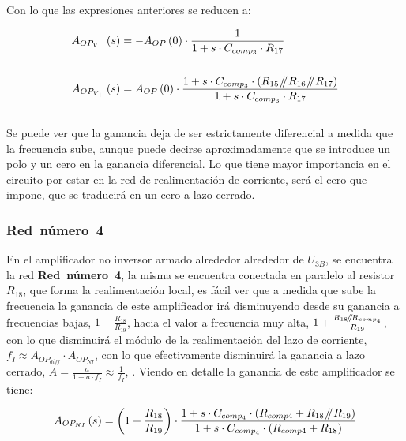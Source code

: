 Con lo que las expresiones anteriores se reducen a:

\begin{align}
\begin{split}
A_{OP_{V_{-}}}\left( s \right) &= - A_{OP}\left( 0 \right) \cdot \frac{1}{1 + s \cdot C_{comp_{3}} \cdot R_{17} }
\\\\
A_{OP_{V_{+}}}\left( s \right) &= A_{OP}\left( 0 \right) \cdot \frac{ 1 + s \cdot C_{comp_{3}} \cdot \left(  R_{15} \mathbin{\!/\mkern-5mu/\!} R_{16} \mathbin{\!/\mkern-5mu/\!} R_{17}   \right) }{1 + s \cdot C_{comp_{3}} \cdot R_{17} }
\end{split}
\end{align}\\

Se puede ver que la ganancia deja de ser estrictamente diferencial a medida que la frecuencia sube, aunque puede decirse aproximadamente que se introduce un polo  y un cero en la ganancia diferencial. Lo que tiene mayor importancia en el circuito por estar en la red de realimentación de corriente, será el cero que impone, que se traducirá en un cero a lazo cerrado.


\subsubsection{\textbf{Red~número~4}}

En el amplificador no inversor armado alrededor alrededor de $U_{3B}$, se encuentra la red \textbf{Red~número~4}, la misma se encuentra conectada en paralelo al resistor $R_{18}$, que forma la realimentación local, es fácil ver que a medida que sube la frecuencia la ganancia de este amplificador irá disminuyendo desde su ganancia a frecuencias bajas, $1 + \frac{R_{18}}{R_{19}}$, hacia el valor a frecuencia muy alta, $1 + \frac{R_{18} \mathbin{\!/\mkern-5mu/\!} R_{comp_{4}}}{R_{19}}$, con lo que disminuirá el módulo de la realimentación del lazo de corriente, $f_{I} \approx A_{OP_{diff}} \cdot A_{OP_{NI}}$, con lo que efectivamente disminuirá la ganancia a lazo cerrado, $ A = \frac{a}{1 + a \cdot f_{I}} \approx \frac{1}{f_{I}}$, . Viendo en detalle la ganancia de este amplificador se tiene:

\begin{equation}
A_{OP_{NI}}\left( s \right) = \left( 1 + \frac{ R_{18} }{ R_{19} } \right) \cdot \frac{ 1 + s \cdot C_{comp_{4}} \cdot \left(  R_{comp4} + R_{18} \mathbin{\!/\mkern-5mu/\!} R_{19}  \right)  }{1+ s \cdot C_{comp_{4}} \cdot \left( R_{comp4} + R_{18} \right) }
\end{equation}\\

